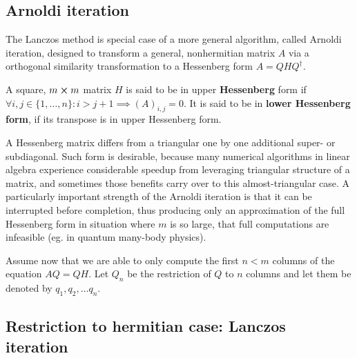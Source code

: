 \subsection{Arnoldi iteration}
The Lanczos method is special case of a more general algorithm, called Arnoldi iteration, designed to transform
a general, nonhermitian matrix \(A\) via a orthogonal similarity transformation to a Hessenberg form \(A = QHQ^{\dagger}\).

\begin{definition}
    A square, \(m \cross m\) matrix \(H\) is said to be in upper \textbf{Hessenberg} form if
    \(\forall i,j\in \{1,\ldots,n\}: i > j+1 \implies (A)_{i,j}=0 \).
    It is said to be in \textbf{lower Hessenberg form}, if its transpose is in upper Hessenberg form.
\end{definition}
A Hessenberg matrix differs from a triangular one by one additional super- or subdiagonal.
Such form is desirable, because many numerical algorithms in linear algebra experience considerable speedup
from leveraging triangular structure of a matrix, and sometimes those benefits carry over to this almost-triangular
case. A particularly important strength of the Arnoldi iteration is that it can be interrupted before completion,
thus producing only an approximation of the full Hessenberg form in situation where \(m\) is so large, that
full computations are infeasible (eg. in quantum many-body physics).

Assume now that we are able to only compute the first \(n < m\) columns of the equation \(AQ=QH\).
Let \(Q_n\) be the restriction of \(Q\) to \(n\) columns and let them be denoted by \(q_1, q_2, \ldots q_n\).

\subsection{Restriction to hermitian case: Lanczos iteration}
